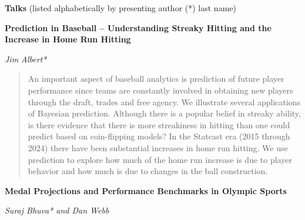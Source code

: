 \documentclass[12pt]{article}
\newenvironment{ttitle}[1]{\noindent \bfseries #1}{}
\newenvironment{tauthor}[1]{\noindent \itshape #1}{}
\begin{document}
\newpage

\noindent
{\Large {\bf Talks}} (listed alphabetically by presenting author (*) last name)



\vfill

\begin{ttitle}
Prediction in Baseball -- Understanding Streaky Hitting and the Increase in Home Run Hitting
\end{ttitle}

\begin{tauthor}
Jim Albert*
\end{tauthor}

\begin{abstract}
An important aspect of baseball analytics is prediction of future player performance since teams are constantly involved in obtaining new players through the draft, trades and free agency. We illustrate several applications of Bayesian prediction.  Although there is a popular belief in streaky ability, is there evidence that there is more streakiness in hitting than one could predict based on coin-flipping models?  In the Statcast era (2015 through 2024) there have been substantial increases in home run hitting.  We use prediction to explore how much of the home run increase is due to player behavior and how much is due to changes in the ball construction.
\end{abstract}


\vfill

\begin{ttitle}
Medal Projections and Performance Benchmarks in Olympic Sports
\end{ttitle}

\begin{tauthor}
Suraj Bhuva* and Dan Webb
\end{tauthor}
\end{document}
